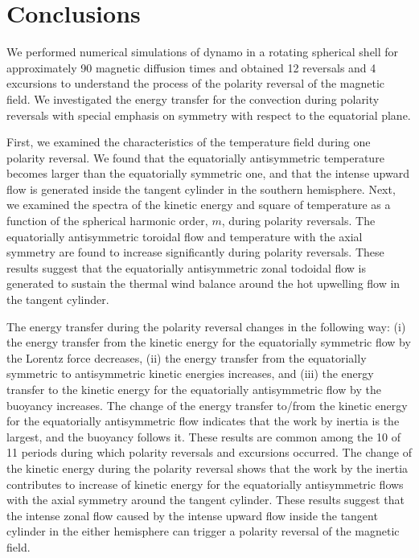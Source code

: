 \section{Conclusions}
\label{section:conclusions}

We performed numerical simulations of dynamo in a rotating spherical shell for approximately 90 magnetic diffusion times and obtained 12 reversals and 4 excursions to understand the process of the polarity reversal of the magnetic field. 
We investigated the energy transfer for the convection during polarity reversals with special emphasis on symmetry with respect to the equatorial plane.

First, we examined the characteristics of the temperature field during one polarity reversal. 
We found that the equatorially antisymmetric temperature becomes larger than the equatorially symmetric one, and that the intense upward flow is generated inside the tangent cylinder in the southern hemisphere. 
Next, we examined the spectra of the kinetic energy and square of temperature as a function of the spherical harmonic order, $m$, during polarity reversals. 
The equatorially antisymmetric toroidal flow and temperature with the axial symmetry are found to increase significantly during polarity reversals.
These results suggest that the equatorially antisymmetric zonal todoidal flow is generated to sustain the thermal wind balance around the hot upwelling flow in the tangent cylinder.

The energy transfer during the polarity reversal changes in the following way: 
(i) the energy transfer from the kinetic energy for the equatorially symmetric flow by the Lorentz force decreases, 
(ii) the energy transfer from the equatorially symmetric to antisymmetric kinetic energies increases, and (iii) the energy transfer to the kinetic energy for the equatorially antisymmetric flow by the buoyancy increases. 
The change of the energy transfer to/from the kinetic energy for the equatorially antisymmetric flow indicates that the work by inertia is the largest, and the buoyancy follows it. 
These results are common among the 10 of 11 periods during which polarity reversals and excursions occurred. 
The change of the kinetic energy during the polarity reversal shows that the work by the inertia contributes to increase of kinetic energy for the equatorially antisymmetric flows with the axial symmetry around the tangent cylinder. 
These results suggest that the intense zonal flow caused by the intense upward flow inside the tangent cylinder in the either hemisphere can trigger a polarity reversal of the magnetic field.

